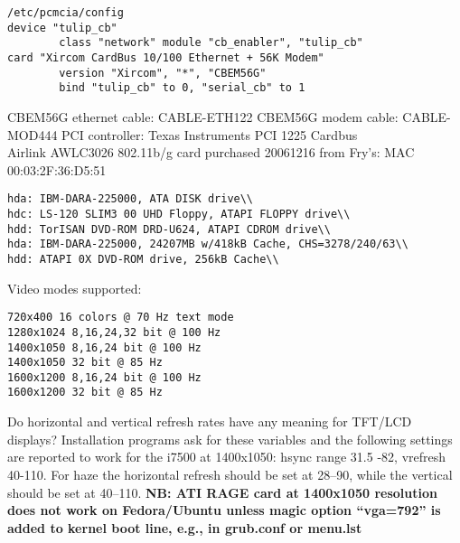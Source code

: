 \documentclass[12pt,twoside]{article}
\begin{document}
\begin{verbatim}
/etc/pcmcia/config
device "tulip_cb"
        class "network" module "cb_enabler", "tulip_cb"
card "Xircom CardBus 10/100 Ethernet + 56K Modem"
        version "Xircom", "*", "CBEM56G"
        bind "tulip_cb" to 0, "serial_cb" to 1
\end{verbatim}
CBEM56G ethernet cable: CABLE-ETH122
CBEM56G modem cable: CABLE-MOD444
PCI controller: Texas Instruments PCI 1225 Cardbus\\
Airlink AWLC3026 802.11b/g card purchased 20061216 from Fry's:
MAC 00:03:2F:36:D5:51
\begin{verbatim}
hda: IBM-DARA-225000, ATA DISK drive\\
hdc: LS-120 SLIM3 00 UHD Floppy, ATAPI FLOPPY drive\\
hdd: TorISAN DVD-ROM DRD-U624, ATAPI CDROM drive\\
hda: IBM-DARA-225000, 24207MB w/418kB Cache, CHS=3278/240/63\\
hdd: ATAPI 0X DVD-ROM drive, 256kB Cache\\
\end{verbatim}
Video modes supported:\\
\begin{verbatim}
720x400 16 colors @ 70 Hz text mode
1280x1024 8,16,24,32 bit @ 100 Hz
1400x1050 8,16,24 bit @ 100 Hz
1400x1050 32 bit @ 85 Hz
1600x1200 8,16,24 bit @ 100 Hz
1600x1200 32 bit @ 85 Hz
\end{verbatim}
Do horizontal and vertical refresh rates have any meaning for TFT/LCD
displays?
Installation programs ask for these variables and the following
settings are reported to work for the i7500 at 1400x1050: hsync range
31.5 -82, vrefresh 40-110. 
For haze the horizontal refresh should be set at 28--90, while the
vertical should be set at 40--110.
\textbf{NB: ATI RAGE card at 1400x1050 resolution does not work on
Fedora/Ubuntu unless magic option ``vga=792'' is added to
kernel boot line, e.g., in grub.conf or menu.lst}
\end{document}

